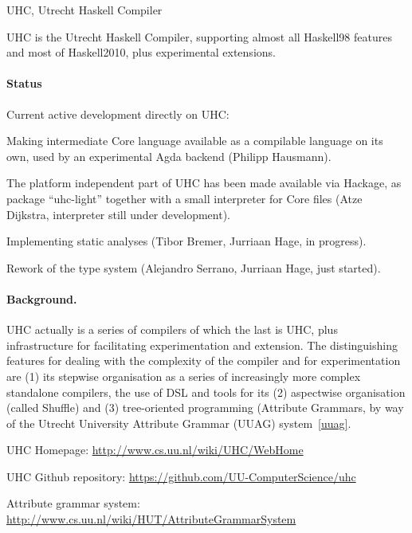 \begin{hcarentry}[section]{UHC, Utrecht Haskell Compiler}
\label{uhc}
\label{ehc}
\makeheader


UHC is the Utrecht Haskell Compiler, supporting almost all Haskell98 features and most of Haskell2010, plus
experimental extensions.

\paragraph{Status}

Current active development directly on UHC:
\begin{compactitem}
\item Making intermediate Core language available as a compilable language on its own, used by an experimental Agda backend (Philipp Hausmann).
\item The platform independent part of UHC has been made available via Hackage, as package ``uhc-light'' together with a small interpreter for Core files (Atze Dijkstra, interpreter still under development).
\item Implementing static analyses (Tibor Bremer, Jurriaan Hage, in progress).
\item Rework of the type system (Alejandro Serrano, Jurriaan Hage, just started).
\end{compactitem}

\paragraph{Background.}

UHC actually is a series of compilers of which the last is UHC, plus
infrastructure for facilitating experimentation and extension.
The distinguishing features for dealing with the complexity of the compiler and for experimentation are
(1) its stepwise organisation as a series of increasingly more complex standalone compilers,
the use of DSL and tools for its (2) aspectwise organisation (called Shuffle) and
(3) tree-oriented programming (Attribute Grammars, by way of the
Utrecht University Attribute Grammar (UUAG) system~\cref{uuag}.

\FurtherReading
\begin{compactitem}
\item UHC Homepage:
\url{http://www.cs.uu.nl/wiki/UHC/WebHome}

\item UHC Github repository:
\url{https://github.com/UU-ComputerScience/uhc}

\item Attribute grammar system:
\url{http://www.cs.uu.nl/wiki/HUT/AttributeGrammarSystem}

\end{compactitem}
\end{hcarentry}

